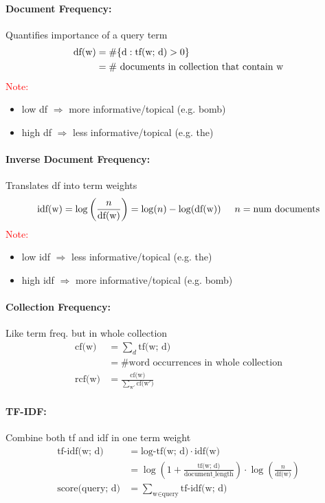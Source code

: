 \documentclass[a4paper,11pt]{article}
\newcommand{\tf}{\text{tf(w; d)}} %
\newcommand{\cf}{\text{cf(w)}} %
\newcommand{\df}{\text{df(w)}} %
\newcommand{\idf}{\text{idf(w)}} %
\begin{document}
\begin{multicols}{2}
\paragraph{Document Frequency:} Quantifies importance of a query term
\begin{align*}
  \df =& \; \# \{ \text d : \tf > 0\} \\
         =& \; \# \text{ documents in collection that contain w}
\end{align*}
\textcolor{red}{Note:}
\begin{itemize}[leftmargin=0.3cm]
  \item low df $\Rightarrow$ more informative/topical (e.g. bomb)
  \item high df $\Rightarrow$ less informative/topical (e.g. the)
\end{itemize}

\paragraph{Inverse Document Frequency:}\hspace{-0.3cm}Translates df into term weights\\
\begin{align*}
  \idf = \log\left(\frac{n}{\df} \right) = \log(n) - \log(\df) \hspace{0.5cm} n = \text{num documents}
\end{align*}
\textcolor{red}{Note:}
\begin{itemize}[leftmargin=0.3cm]
  \item low idf $\Rightarrow$ less informative/topical (e.g. the)
  \item high idf $\Rightarrow$ more informative/topical (e.g. bomb)
\end{itemize}

\paragraph{Collection Frequency:} Like term freq. but in whole collection
\begin{align*}
  \cf &= \sum_d \tf \\
         &= \# \text{word occurrences in whole collection}\\
  \text{rcf(w)} &= \frac{\cf}{\sum\limits_{\text{w}'} \text{cf(w$'$)}}
\end{align*}

\paragraph{TF-IDF:} Combine both tf and idf in one term weight
\begin{align*}
  \text{tf-idf(w; d)} &= \text{log-tf(w; d)} \cdot \idf \\
                      &= \log \left(1 + \frac{\tf}{\text{document\_length}} \right) \cdot \log \left( \frac{n}{\df} \right)\\
  \text{score(query; d)} &= \sum_{\text{w} \in \text{query}} \text{tf-idf(w; d)}
\end{align*}


\end{multicols}
\end{document}
